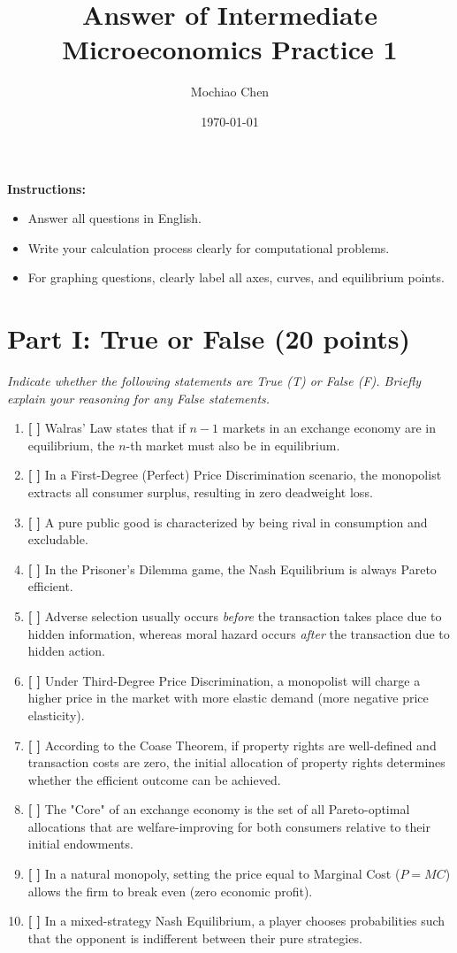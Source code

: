 \documentclass[12pt]{article}
\title{\textbf{Answer of Intermediate Microeconomics Practice 1}}
\author{Mochiao Chen}
\date{\today}
\begin{document}
\maketitle
\noindent \textbf{Instructions:}
\begin{itemize}
    \item Answer all questions in English.
    \item Write your calculation process clearly for computational problems.
    \item For graphing questions, clearly label all axes, curves, and equilibrium points.
\end{itemize}

\section*{Part I: True or False (20 points)}
\textit{Indicate whether the following statements are True (T) or False (F). Briefly explain your reasoning for any False statements.}

\begin{enumerate}
    \item \textbf{[ \quad ]} Walras' Law states that if $n-1$ markets in an exchange economy are in equilibrium, the $n$-th market must also be in equilibrium.
    \item \textbf{[ \quad ]} In a First-Degree (Perfect) Price Discrimination scenario, the monopolist extracts all consumer surplus, resulting in zero deadweight loss.
    \item \textbf{[ \quad ]} A pure public good is characterized by being rival in consumption and excludable.
    \item \textbf{[ \quad ]} In the Prisoner's Dilemma game, the Nash Equilibrium is always Pareto efficient.
    \item \textbf{[ \quad ]} Adverse selection usually occurs \textit{before} the transaction takes place due to hidden information, whereas moral hazard occurs \textit{after} the transaction due to hidden action.
    \item \textbf{[ \quad ]} Under Third-Degree Price Discrimination, a monopolist will charge a higher price in the market with more elastic demand (more negative price elasticity).
    \item \textbf{[ \quad ]} According to the Coase Theorem, if property rights are well-defined and transaction costs are zero, the initial allocation of property rights determines whether the efficient outcome can be achieved.
    \item \textbf{[ \quad ]} The "Core" of an exchange economy is the set of all Pareto-optimal allocations that are welfare-improving for both consumers relative to their initial endowments.
    \item \textbf{[ \quad ]} In a natural monopoly, setting the price equal to Marginal Cost ($P = MC$) allows the firm to break even (zero economic profit).
    \item \textbf{[ \quad ]} In a mixed-strategy Nash Equilibrium, a player chooses probabilities such that the opponent is indifferent between their pure strategies.
\end{enumerate}
\end{document}
